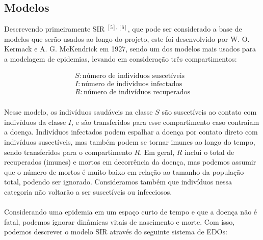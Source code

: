 \documentclass[12pt]{article}
\begin{document}
\subsection{Modelos}

Descrevendo primeiramente SIR $^{[5], [6]}$, que pode ser considerado a base de modelos que serão usados ao longo do projeto, este foi desenvolvido por W. O. Kermack e A. G. McKendrick em 1927, sendo um dos modelos mais usados para a modelagem de epidemias, levando em consideração três compartimentos:

\begin{gather*}
    S: \text{número de indivíduos suscetíveis} \\
    I: \text{número de indivíduos infectados} \\
    R: \text{número de indivíduos recuperados}
\end{gather*}
\\
Nesse modelo, os indivíduos saudáveis na classe $S$ são suscetíveis ao contato com indivíduos da classe $I$, e são transferidos para esse compartimento caso contraiam a doença. Indivíduos infectados podem espalhar a doença por contato direto com indivíduos suscetíveis, mas também podem se tornar imunes ao longo do tempo, sendo transferidos para o compartimento $R$. Em geral, $R$ inclui o total de recuperados (imunes) e mortos em decorrência da doença, mas podemos assumir que o número de mortos é muito baixo em relação ao tamanho da população total, podendo ser ignorado. Consideramos também que indivíduos nessa categoria não voltarão a ser suscetíveis ou infecciosos.   
\\\\
Considerando uma epidemia em um espaço curto de tempo e que a doença não é fatal, podemos ignorar dinâmicas vitais de nascimento e morte. Com isso, podemos descrever o modelo SIR através do seguinte sistema de EDOs:
\end{document}
